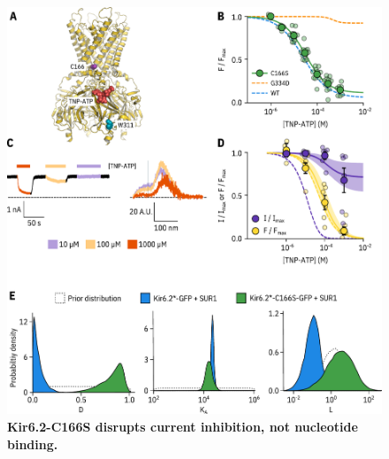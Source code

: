 \documentclass[10pt,lineno, doublespacing]{elife_modified}
\begin{document}
\begin{figure}
\begin{fullwidth}
\centering
\includegraphics[height=0.75\textheight]{figure_three}
\caption{\textbf{Kir6.2-C166S disrupts current inhibition, not nucleotide binding.}}
\label{fig:three}
\end{fullwidth}
\end{figure}
\end{document}
